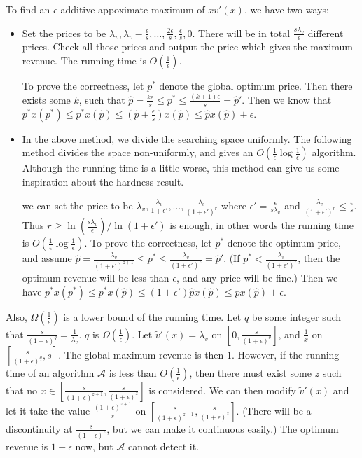\documentclass{article}
\begin{document}
To find an $\epsilon$-additive appoximate maximum of $xv'(x)$, we have two ways:
\begin{itemize}
    \item Set the prices to be $\lambda_v,\lambda_v-\frac{\epsilon}{s},\ldots,\frac{2\epsilon}{s},\frac{\epsilon}{s},0$. There will be in total $\frac{s\lambda_v}{\epsilon}$ different prices. Check all those prices and output the price which gives the maximum revenue. The running time is $O(\frac{1}{\epsilon})$.

    To prove the correctness, let $p^*$ denote the global optimum price. Then there exists some $k$, such that $\hat{p}=\frac{k\epsilon}{s}\le p^*\le \frac{(k+1)\epsilon}{s}=\hat{p}'$. Then we know that $p^*x(p^*)\le p^*x(\hat{p})\le(\hat{p}+\frac{\epsilon}{s})x(\hat{p})\le\hat{p}x(\hat{p})+\epsilon$.

    \item In the above method, we divide the searching space uniformly. The following method divides the space non-uniformly, and gives an $O(\frac{1}{\epsilon}\log \frac{1}{\epsilon})$ algorithm. Although the running time is a little worse, this method can give us some inspiration about the hardness result.

    we can set the price to be $\lambda_v,\frac{\lambda_v}{1+\epsilon'},\ldots,\frac{\lambda_v}{(1+\epsilon')^r}$ where $\epsilon'=\frac{\epsilon}{s\lambda_v}$ and $\frac{\lambda_v}{(1+\epsilon')^r}\le \frac{\epsilon}{s}$. Thus $r\ge\ln (\frac{s\lambda_v}{\epsilon})/\ln(1+\epsilon')$ is enough, in other words the running time is $O(\frac{1}{\epsilon}\log \frac{1}{\epsilon})$. To prove the correctness, let $p^*$ denote the optimum price, and assume $\hat{p}=\frac{\lambda_v}{(1+\epsilon')^{z+1}}\le p^*\le \frac{\lambda_v}{(1+\epsilon')^z}=\hat{p}'$. (If $p^*<\frac{\lambda_v}{(1+\epsilon')^r}$, then the optimum revenue will be less than $\epsilon$, and any price will be fine.) Then we have $p^*x(p^*)\le p^*x(\hat{p})\le(1+\epsilon')\hat{p}x(\hat{p})\le \hat{p}x(\hat{p})+\epsilon$.
\end{itemize}

Also, $\Omega(\frac{1}{\epsilon})$ is a lower bound of the running time. Let $q$ be some integer such that $\frac{s}{(1+\epsilon)^q}=\frac{1}{\lambda_v}$. $q$ is $\Omega(\frac{1}{\epsilon})$. Let $\tilde{v}'(x)=\lambda_v$ on $[0,\frac{s}{(1+\epsilon)^q}]$, and $\frac{1}{x}$ on $[\frac{s}{(1+\epsilon)^q},s]$. The global maximum revenue is then $1$. However, if the running time of an algorithm $\mathcal{A}$ is less than $O(\frac{1}{\epsilon})$, then there must exist some $z$ such that no $x\in[\frac{s}{(1+\epsilon)^{z+1}},\frac{s}{(1+\epsilon)^z}]$ is considered. We can then modify $\tilde{v}'(x)$ and let it take the value $\frac{(1+\epsilon)^{z+1}}{s}$ on $[\frac{s}{(1+\epsilon)^{z+1}},\frac{s}{(1+\epsilon)^z}]$. (There will be a discontinuity at $\frac{s}{(1+\epsilon)^z}$, but we can make it continuous easily.) The optimum revenue is $1+\epsilon$ now, but $\mathcal{A}$ cannot detect it.
\end{document}
